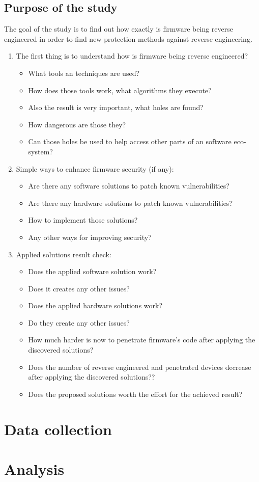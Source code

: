 \documentclass[]{report}
\begin{document}
\subsection{Purpose of the study} 
The goal of the study is to find out how exactly is firmware being reverse engineered in order to find new protection methods against reverse engineering.
\begin{enumerate}
	\item The first thing is to understand how is firmware being reverse engineered? 
 	\begin{itemize}
 	\item What tools an techniques are used? 
 	\item How does those tools work, what algorithms they execute? 
 	\item Also the result is very important, what holes are found? 
 	\item How dangerous are those they? 
 	\item Can those holes be used to help access other parts of an software eco-system?
 	\end{itemize}

	\item Simple ways to enhance firmware security (if any):
	\begin{itemize}
	\item Are there any software solutions to patch known vulnerabilities?
	\item Are there any hardware solutions to patch known vulnerabilities?
	\item How to implement those solutions?
	\item Any other ways for improving security?
	\end{itemize}

\item Applied solutions result check:
\begin{itemize}
\item Does the applied software solution work?
\item Does it creates any other issues?
\item Does the applied hardware solutions work?
\item Do they create any other issues?
\item How much harder is now to penetrate firmware's code after applying the discovered solutions?
\item Does the number of reverse engineered and penetrated devices decrease after applying the discovered solutions??
\item Does the proposed solutions worth the effort for the achieved result?
\end{itemize}
\end{enumerate}
\section{Data collection}
\section{Analysis}
\end{document}
